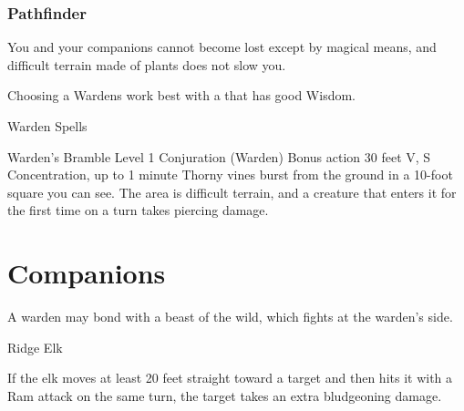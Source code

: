 \documentclass[letterpaper,twoside,twocolumn,openany,nodeprecatedcode,
  style=2024,srd=5.2.1,justified,links=color,index]{dndbook}
\newcommand{\species}{\DndIfSRD{5.2}{species}{race}}
\begin{document}
\subsection{Pathfinder}
You and your companions cannot become lost except by magical means, and difficult terrain made of plants does not slow you.

\begin{DndComment}{Choosing a }
  Wardens work best with a \species{} that has good Wisdom. 
\end{DndComment}

\begin{DndSpellList}{Warden Spells}
\end{DndSpellList}

\DndSpellHeader%
  {Warden's Bramble}
  {Level 1 Conjuration (Warden)}
  {Bonus action}
  {30 feet}
  {V, S}
  {Concentration, up to 1 minute}
Thorny vines burst from the ground in a 10-foot square you can see. The area is difficult terrain, and a creature that enters it for the first time on a turn takes  piercing damage.

\chapter{Companions}

A warden may bond with a beast of the wild, which fights at the warden's side.

\begin{DndMonster}{Ridge Elk}

  \DndMonsterBasics[
      armor-class = {12},
      initiative  = {+2 (12)},
      hit-points  = {\DndDice{3d10 + 6}},
      speed       = {50 ft.},
    ]

  \DndMonsterAbilityScores[
      str = 16, dex = 14, con = 14,
      int = 2, wis = 12, cha = 5,
    ]

  \DndMonsterDetails[
      senses    = {Passive Perception 11},
      languages = {None},
      challenge = {1/2},
    ]

  If the elk moves at least 20 feet straight toward a target and then hits it with a Ram attack on the same turn, the target takes an extra  bludgeoning damage.

  \DndMonsterMelee[
    name=Ram,
    mod=+5,
    dmg=\DndDice{1d6+3},
    dmg-type=bludgeoning,
  ]
\end{DndMonster}
\end{document}
